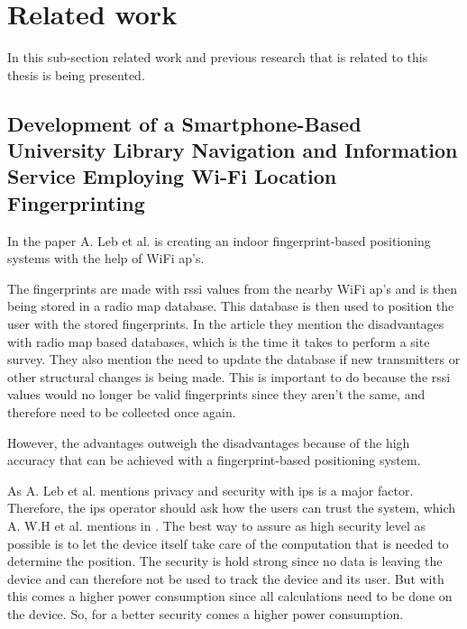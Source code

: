 \section{Related work}\label{sec:theoryRelatedWork}
In this sub-section related work and previous research that is related to this thesis is being presented.


\subsection{Development of a Smartphone-Based University Library Navigation and Information Service Employing Wi-Fi Location Fingerprinting}
In the paper \cite{DevelopmentSmartphoneBasedUniversity2021} A. Leb et al. is creating an indoor fingerprint-based positioning systems with the help of WiFi \acrshort{ap}'s.

\bigskip

The fingerprints are made with \acrshort{rssi} values from the nearby WiFi \acrshort{ap}'s
and is then being stored in a radio map database.
This database is then used to position the user with the stored fingerprints.
In the article they mention the disadvantages with radio map based databases, which is the time it takes to perform a site survey.
They also mention the need to update the database if new transmitters or other structural changes is being made.
This is important to do because the \acrshort{rssi} values would no longer be valid fingerprints since they aren't the same, and therefore need to be collected once again.

\bigskip

However, the advantages outweigh the disadvantages because of the high accuracy that can be achieved with a fingerprint-based positioning system.

\bigskip

As A. Leb et al. mentions privacy and security with \acrshort{ips} is a major factor.
Therefore, the \acrshort{ips} operator should ask how the users can trust the system, which A. W.H et al. mentions in \cite{SurveyWirelessIndoor2019}.
The best way to assure as high security level as possible is to let the device itself take care of the computation that is needed to determine the position.
The security is hold strong since no data is leaving the device and can therefore not be used to track the device and its user.
But with this comes a higher power consumption since all calculations need to be done on the device.
So, for a better security comes a higher power consumption.

